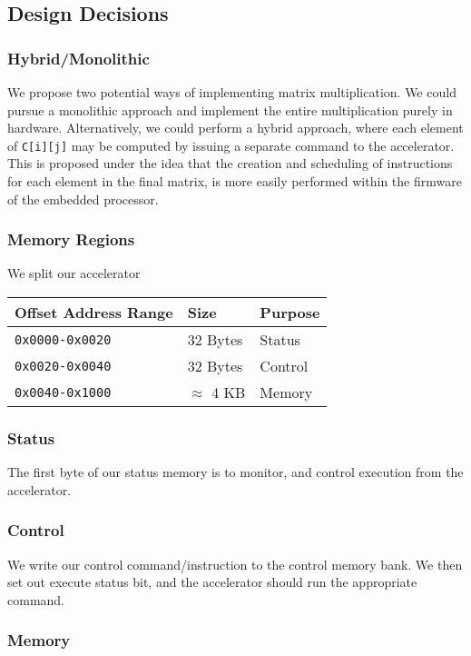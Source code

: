 \documentclass[a4paper,9pt]{report}
\begin{document}
\subsection{Design Decisions}
\subsubsection{Hybrid/Monolithic}
We propose two potential ways of implementing matrix multiplication. We could
pursue a monolithic approach and implement the entire multiplication purely in
hardware. Alternatively, we could perform a hybrid approach, where each element
of \texttt{C[i][j]} may be computed by issuing a separate command to the
accelerator. This is proposed under the idea that the creation and scheduling of
instructions for each element in the final matrix, is more easily performed
within the firmware of the embedded processor.

\subsubsection{Memory Regions}
We split our accelerator 
\begin{table}
  \centering
\begin{tabular}{lll}
  \toprule
  Offset Address Range & Size & Purpose \\
  \midrule
  \texttt{0x0000-0x0020} & 32 Bytes & Status \\
  \texttt{0x0020-0x0040} & 32 Bytes & Control \\
  \texttt{0x0040-0x1000} & $\approx$ 4 KB & Memory \\
  \bottomrule
\end{tabular}
\end{table}

\subsubsection{Status}
The first byte of our status memory is to monitor, and control execution from
the accelerator.

\subsubsection{Control}
We write our control command/instruction to the control memory bank. We then set out
execute status bit, and the accelerator should run the appropriate command.

\subsubsection{Memory}
\end{document}
